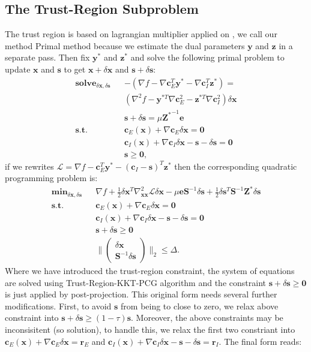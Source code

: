 \documentclass[annual]{acmsiggraph}
\newcommand{\E}[1]{\mathbf{#1}}
\newcommand{\TWOC}[2]{\left(\begin{array}{c}#1 \\ #2\end{array}\right)}
\begin{document}
\subsection{The Trust-Region Subproblem}
The trust region is based on lagrangian multiplier applied on , we call our method Primal method because we estimate the dual parameters $\E{y}$ and $\E{z}$ in a separate pass. Then fix $\E{y}^*$ and $\E{z}^*$ and solve the following primal problem to update $\E{x}$ and $\E{s}$ to get $\E{x}+\delta\E{x}$ and $\E{s}+\delta\E{s}$:
\begin{eqnarray*}
\E{solve}_{\delta\E{x}, \delta\E{s}}&&-(\nabla f-\nabla\E{c}_E^T\E{y}^*-\nabla\E{c}_I^T\E{z}^*)=	\\
&&(\nabla^2 f-\E{y}^{*T}\nabla\E{c}_E^2-\E{z}^{*T}\nabla\E{c}_I^2)\delta\E{x}	\\
&&\E{s}+\delta\E{s}=\mu {\E{Z}^*}^{-1} \E{e}	\\
\E{s.t.}&&\E{c}_E(\E{x})+\nabla\E{c}_E\delta\E{x}=\E{0}	\\
&&\E{c}_I(\E{x})+\nabla\E{c}_I\delta\E{x}-\E{s}-\delta\E{s}=\E{0}	\\
&&\E{s} \geq \E{0},
\end{eqnarray*}
if we rewrites $\mathcal{L}=\nabla f-\E{c}_E^T\E{y}^*-(\E{c}_I-\E{s})^T\E{z}^*$ then the corresponding quadratic programming problem is:
\begin{eqnarray*}
\E{min}_{\delta\E{x}, \delta\E{s}}&&\nabla f+\frac{1}{2}\delta\E{x}^T\nabla^2_{\E{x}\E{x}}\mathcal{L}\delta\E{x}-\mu\E{e}\E{S}^{-1}\delta\E{s}+\frac{1}{2}\delta\E{s}^T\E{S}^{-1}\E{Z}^*\delta\E{s}	\\
\E{s.t.}&&\E{c}_E(\E{x})+\nabla\E{c}_E\delta\E{x}=\E{0}	\\
&&\E{c}_I(\E{x})+\nabla\E{c}_I\delta\E{x}-\E{s}-\delta\E{s}=\E{0}	\\
&&\E{s}+\delta\E{s} \geq \E{0}	\\
&&\|\TWOC{\delta\E{x}}{\E{S}^{-1}\delta\E{s}}\|_2\leq\Delta.
\end{eqnarray*}
Where we have introduced the trust-region constraint, the system of equations are solved using Trust-Region-KKT-PCG algorithm and the constraint $\E{s}+\delta\E{s} \geq \E{0}$ is just applied by post-projection. This original form needs several further modifications. First, to avoid $\E{s}$ from being to close to zero, we relax above constraint into $\E{s}+\delta\E{s} \geq (1-\tau) \E{s}$. Moreover, the above constraints may be inconsisitent (so solution), to handle this, we relax the first two constriant into $\E{c}_E(\E{x})+\nabla\E{c}_E\delta\E{x}=\E{r}_E$ and $\E{c}_I(\E{x})+\nabla\E{c}_I\delta\E{x}-\E{s}-\delta\E{s}=\E{r}_I$. The final form reads:
\end{document}
